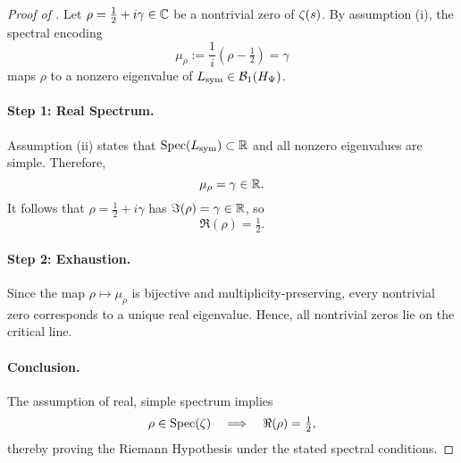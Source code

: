 \begin{proof}[Proof of ]
Let \( \rho = \tfrac{1}{2} + i\gamma \in \mathbb{C} \) be a nontrivial zero of \( \zeta(s) \). By assumption (i), the spectral encoding
\[
\mu_\rho := \frac{1}{i}(\rho - \tfrac{1}{2}) = \gamma
\]
maps \( \rho \) to a nonzero eigenvalue of \( L_{\mathrm{sym}} \in \mathcal{B}_1(H_{\Psi}) \).

\paragraph{Step 1: Real Spectrum.}
Assumption (ii) states that \( \operatorname{Spec}(L_{\mathrm{sym}}) \subset \mathbb{R} \) and all nonzero eigenvalues are simple. Therefore,
\[
\mu_\rho = \gamma \in \mathbb{R}.
\]
It follows that \( \rho = \tfrac{1}{2} + i\gamma \) has \( \Im(\rho) = \gamma \in \mathbb{R} \), so
\[
\Re(\rho) = \tfrac{1}{2}.
\]

\paragraph{Step 2: Exhaustion.}
Since the map \( \rho \mapsto \mu_\rho \) is bijective and multiplicity-preserving, every nontrivial zero corresponds to a unique real eigenvalue. Hence, all nontrivial zeros lie on the critical line.

\paragraph{Conclusion.}
The assumption of real, simple spectrum implies
\[
\rho \in \operatorname{Spec}(\zeta) \quad \Longrightarrow \quad \Re(\rho) = \tfrac{1}{2},
\]
thereby proving the Riemann Hypothesis under the stated spectral conditions.
\end{proof}
